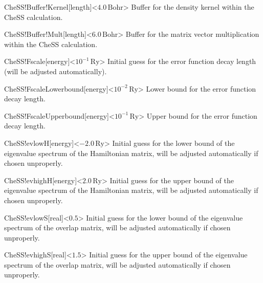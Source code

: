 \begin{fdfentry}{CheSS!Buffer!Kernel}[length]<$4.0\,\mathrm{Bohr}$>
  Buffer for the density kernel within the CheSS calculation.
\end{fdfentry}

\begin{fdfentry}{CheSS!Buffer!Mult}[length]<$6.0\,\mathrm{Bohr}$>
  Buffer for the matrix vector multiplication within the CheSS calculation.
\end{fdfentry}

\begin{fdfentry}{CheSS!Fscale}[energy]<$10^{-1}\,\mathrm{Ry}$>
	Initial guess for the error function decay length (will be adjusted automatically).
\end{fdfentry}

\begin{fdfentry}{CheSS!FscaleLowerbound}[energy]<$10^{-2}\,\mathrm{Ry}$>
	Lower bound for the error function decay length.
\end{fdfentry}

\begin{fdfentry}{CheSS!FscaleUpperbound}[energy]<$10^{-1}\,\mathrm{Ry}$>
	Upper bound for the error function decay length.
\end{fdfentry}

\begin{fdfentry}{CheSS!evlowH}[energy]<$-2.0\,\mathrm{Ry}$>
	Initial guess for the lower bound of the eigenvalue spectrum of the Hamiltonian matrix, will be adjusted automatically if chosen unproperly.
\end{fdfentry}

\begin{fdfentry}{CheSS!evhighH}[energy]<$2.0\,\mathrm{Ry}$>
	Initial guess for the upper bound of the eigenvalue spectrum of the Hamiltonian matrix, will be adjusted automatically if chosen unproperly.
\end{fdfentry}

\begin{fdfentry}{CheSS!evlowS}[real]<$0.5$>
	Initial guess for the lower bound of the eigenvalue spectrum of the overlap matrix, will be adjusted automatically if chosen unproperly.
\end{fdfentry}

\begin{fdfentry}{CheSS!evhighS}[real]<$1.5$>
	Initial guess for the upper bound of the eigenvalue spectrum of the overlap matrix, will be adjusted automatically if chosen unproperly.
\end{fdfentry}


